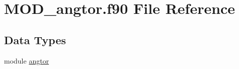 \hypertarget{MOD__angtor_8f90}{\section{M\-O\-D\-\_\-angtor.\-f90 File Reference}
\label{MOD__angtor_8f90}
}
\subsection*{Data Types}
\begin{DoxyCompactItemize}
\item 
module \hyperlink{classangtor}{angtor}
\end{DoxyCompactItemize}
